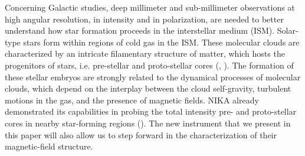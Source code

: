 \documentclass[]{aa} %
\begin{document}


Concerning Galactic studies, deep millimeter and sub-millimeter observations at high angular resolution, in intensity and in polarization, are needed to better understand how star formation proceeds in the interstellar medium (ISM). Solar-type stars form within regions of cold gas in the ISM. These molecular clouds are characterized by an intricate  filamentary structure of matter, which hosts the progenitors of stars, i.e. pre-stellar and proto-stellar cores (\cite{Andre2010}, \cite{Konyves2015}). The formation of these stellar embryos are strongly related to the dynamical processes of molecular clouds, which depend on the interplay between the cloud self-gravity, turbulent motions in the gas, and the presence of magnetic fields. NIKA already demonstrated its capabilities in probing the total intensity pre- and proto-stellar cores in nearby star-forming regions (\cite{Bracco2017}). The new instrument that we present in this paper will also allow us to step forward in the characterization of their magnetic-field structure.
\end{document}
